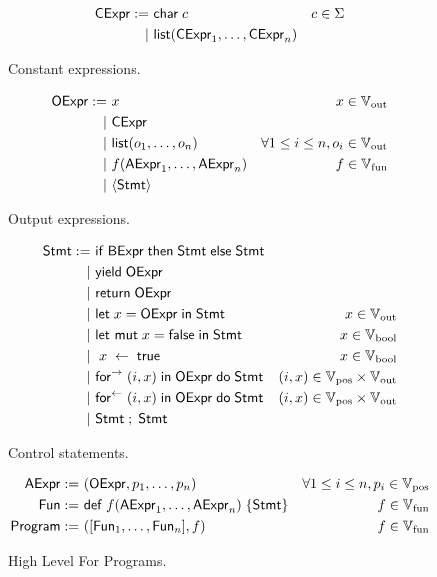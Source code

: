 \begin{figure}[h]
    \centering
    \begin{align*}
        \mathsf{CExpr} :=&~ \mathsf{char} \; c & c \in \Sigma \\
               |&~ \mathsf{list}(\mathsf{CExpr}_1, \ldots, \mathsf{CExpr}_n)
    \end{align*}
    \caption{Constant expressions.}
\end{figure}

\begin{figure}[h]
    \centering
    \begin{align*}
        \mathsf{OExpr} :=&~ x & x \in \mathbb{V}_{\text{out}} \\
               |&~ \mathsf{CExpr} \\
               |&~ \mathsf{list}(o_1, \ldots, o_n) & \forall 1 \leq i \leq n, o_i \in \mathbb{V}_{\text{out}} \\
               |&~ f(\mathsf{AExpr}_1, \dots, \mathsf{AExpr}_n) & f \in \mathbb{V}_{\text{fun}} \\
               |&~ \langle \mathsf{Stmt} \rangle
    \end{align*}
    \caption{Output expressions.}
\end{figure}

\begin{figure}[h]
    \centering
    \begin{align*}
        \mathsf{Stmt} :=&~ \mathsf{if} \; \mathsf{BExpr} \; \mathsf{then} \; \mathsf{Stmt} \; \mathsf{else} \; \mathsf{Stmt} \\
               |&~ \mathsf{yield} \; \mathsf{OExpr} \\
               |&~ \mathsf{return} \; \mathsf{OExpr} \\
               |&~ \mathsf{let} \; x = \mathsf{OExpr} \; \mathsf{in} \; \mathsf{Stmt} & x \in \mathbb{V}_{\text{out}} \\
               |&~ \mathsf{let~mut} \; x = \mathsf{false} \; \mathsf{in} \; \mathsf{Stmt} & x \in \mathbb{V}_{\text{bool}} \\
               |&~ \; x \; \leftarrow \; \mathsf{true} & x \in \mathbb{V}_{\text{bool}} \\
               |&~ \mathsf{for}^{\rightarrow} \; (i,x) \; \mathsf{in} \; \mathsf{OExpr} \; \mathsf{do} \; \mathsf{Stmt} & (i,x) \in \mathbb{V}_{\text{pos}} \times \mathbb{V}_{\text{out}} \\
               |&~ \mathsf{for}^{\leftarrow} \; (i,x) \; \mathsf{in} \; \mathsf{OExpr} \; \mathsf{do} \; \mathsf{Stmt} & (i,x) \in \mathbb{V}_{\text{pos}} \times \mathbb{V}_{\text{out}} \\
               |&~ \mathsf{Stmt} \; ; \; \mathsf{Stmt}
    \end{align*}
    \caption{Control statements.}
\end{figure}

\begin{figure}[h]
    \centering
    \begin{align*}
        \mathsf{AExpr} :=&~ (\mathsf{OExpr}, p_1, \dots, p_n) & \forall 1 \leq i \leq n, p_i \in \mathbb{V}_{\text{pos}} \\
        \mathsf{Fun} :=&~ \mathsf{def} \; f(\mathsf{AExpr}_1, \dots, \mathsf{AExpr}_n) \; \{ \mathsf{Stmt} \} & f \in \mathbb{V}_{\text{fun}} \\
        \mathsf{Program} :=&~ ([\mathsf{Fun}_1, \dots, \mathsf{Fun}_n], f) & f \in \mathbb{V}_{\text{fun}} \\
    \end{align*}
    \caption{High Level For Programs.}
\end{figure}


